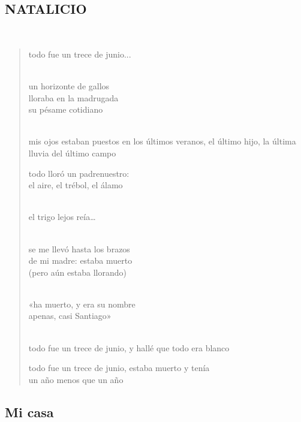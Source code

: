 \documentclass[a4paper, 12pt]{article}
\begin{document}
\pagebreak
\subsection{NATALICIO}
~ 

\begin{verse}
    
todo fue un trece de junio...\\
~ 

un horizonte de gallos\\
lloraba en la madrugada\\
su pésame cotidiano\\
~ 

mis ojos estaban puestos
en los últimos veranos,
el último hijo, la última
lluvia del último campo
~

todo lloró un padrenuestro:\\
el aire, el trébol, el álamo\\
~ 

el trigo lejos reía…\\
~ 

se me llevó hasta los brazos\\
de mi madre: estaba muerto\\
(pero aún estaba llorando)\\
~ 

«ha muerto, y era su nombre\\
apenas, casi Santiago»\\
~ 

todo fue un trece de junio,
y hallé que todo era blanco 
~

todo fue un trece de junio,
estaba muerto y tenía\\
un año menos que un año\\
\end{verse}

\pagebreak 
\subsection{Mi casa}

\scriptsize
\begin{quote}

\end{quote}
\normalsize
\end{document}

